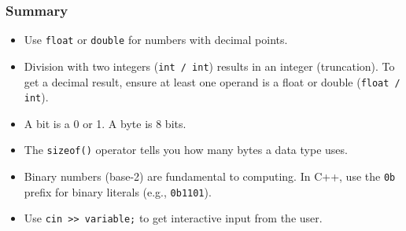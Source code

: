 \documentclass{beamer}
\begin{document}
\begin{frame}
\frametitle{Summary}
\begin{itemize}
    \item Use \texttt{float} or \texttt{double} for numbers with decimal points.
    \item Division with two integers (\texttt{int / int}) results in an \alert{integer} (truncation). To get a decimal result, ensure at least one operand is a float or double (\texttt{float / int}).
    \item A \alert{bit} is a 0 or 1. A \alert{byte} is 8 bits.
    \item The \texttt{sizeof()} operator tells you how many bytes a data type uses.
    \item Binary numbers (base-2) are fundamental to computing. In C++, use the \texttt{0b} prefix for binary literals (e.g., \texttt{0b1101}).
    \item Use \texttt{cin >> variable;} to get interactive input from the user.
\end{itemize}
\end{frame}
\end{document}
